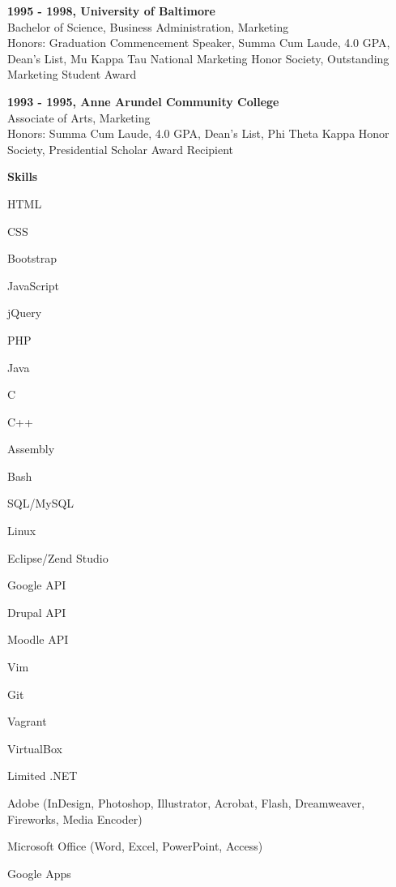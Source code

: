 \documentclass[a4paper,12pt,final]{memoir}
\newcommand{\Sep}{\vspace{1.5em}}
\newcommand{\SmallSep}{\vspace{0.5em}}
\newcommand{\CVSection}[1]
	{\Large\textbf{#1}\par
	\SmallSep\normalsize\normalfont}
\newcommand{\CVItem}[1]
	{\textbf{\color{BrickRed} #1}}
\begin{document}
\CVItem{1995 - 1998, University of Baltimore}\\
Bachelor of Science, Business Administration, Marketing\\
Honors: Graduation Commencement Speaker, Summa Cum Laude, 4.0 GPA, Dean's List, Mu Kappa Tau National Marketing Honor Society, Outstanding Marketing Student Award
\SmallSep

\CVItem{1993 - 1995, Anne Arundel Community College}\\
Associate of Arts, Marketing\\
Honors: Summa Cum Laude, 4.0 GPA, Dean's List, Phi Theta Kappa Honor Society, Presidential Scholar Award Recipient
\Sep

\clearpage
\framebreak
\framebreak

\CVSection{Skills}
\begin{multicols}{3}
\begin{flushleft}
\begin{compactitem}[\color{BrickRed}$\circ$]
	\item HTML
	\item CSS
	\item Bootstrap
	\item JavaScript
	\item jQuery
	\item PHP
	\item Java
	\item C
	\item C++
	\item Assembly
	\item Bash
	\item SQL/MySQL
	\item Linux
	\item Eclipse/Zend Studio
	\item Google API
	\item Drupal API
	\item Moodle API
	\item Vim
	\item Git
	\item Vagrant
	\item VirtualBox
	\item Limited .NET
	\item Adobe (InDesign, Photoshop, Illustrator, Acrobat, Flash, Dreamweaver, Fireworks, Media Encoder)
	\item Microsoft Office (Word, Excel, PowerPoint, Access)
	\item Google Apps 
\end{compactitem}
\end{flushleft}
\end{multicols}
\Sep 
\end{document}
